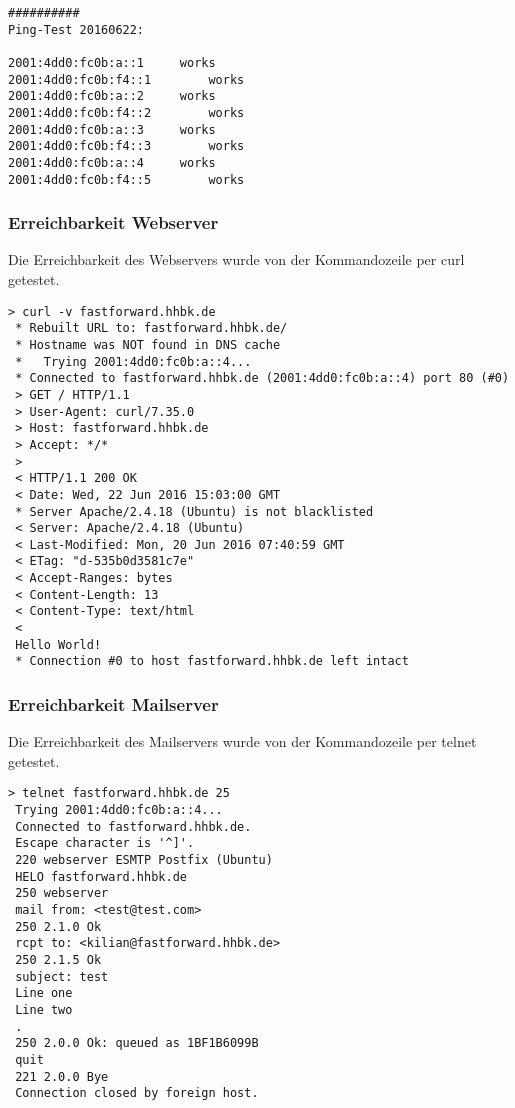 \begin{lstlisting}
##########
Ping-Test 20160622:

2001:4dd0:fc0b:a::1		works
2001:4dd0:fc0b:f4::1		works
2001:4dd0:fc0b:a::2		works
2001:4dd0:fc0b:f4::2		works
2001:4dd0:fc0b:a::3		works
2001:4dd0:fc0b:f4::3		works
2001:4dd0:fc0b:a::4		works
2001:4dd0:fc0b:f4::5		works
\end{lstlisting}

\subsubsection{Erreichbarkeit Webserver}

Die Erreichbarkeit des Webservers wurde von der Kommandozeile per {\sc curl} getestet.

\begin{lstlisting}[numbers=none]
> curl -v fastforward.hhbk.de
 * Rebuilt URL to: fastforward.hhbk.de/
 * Hostname was NOT found in DNS cache
 *   Trying 2001:4dd0:fc0b:a::4...
 * Connected to fastforward.hhbk.de (2001:4dd0:fc0b:a::4) port 80 (#0)
 > GET / HTTP/1.1
 > User-Agent: curl/7.35.0
 > Host: fastforward.hhbk.de
 > Accept: */*
 > 
 < HTTP/1.1 200 OK
 < Date: Wed, 22 Jun 2016 15:03:00 GMT
 * Server Apache/2.4.18 (Ubuntu) is not blacklisted
 < Server: Apache/2.4.18 (Ubuntu)
 < Last-Modified: Mon, 20 Jun 2016 07:40:59 GMT
 < ETag: "d-535b0d3581c7e"
 < Accept-Ranges: bytes
 < Content-Length: 13
 < Content-Type: text/html
 < 
 Hello World!
 * Connection #0 to host fastforward.hhbk.de left intact
\end{lstlisting}

\subsubsection{Erreichbarkeit Mailserver}

Die Erreichbarkeit des Mailservers wurde von der Kommandozeile per {\sc telnet} getestet.

\begin{lstlisting}[numbers=none]
> telnet fastforward.hhbk.de 25
 Trying 2001:4dd0:fc0b:a::4...
 Connected to fastforward.hhbk.de.
 Escape character is '^]'.
 220 webserver ESMTP Postfix (Ubuntu)
 HELO fastforward.hhbk.de
 250 webserver
 mail from: <test@test.com>
 250 2.1.0 Ok
 rcpt to: <kilian@fastforward.hhbk.de>
 250 2.1.5 Ok
 subject: test
 Line one
 Line two
 .
 250 2.0.0 Ok: queued as 1BF1B6099B
 quit
 221 2.0.0 Bye
 Connection closed by foreign host.
\end{lstlisting}


